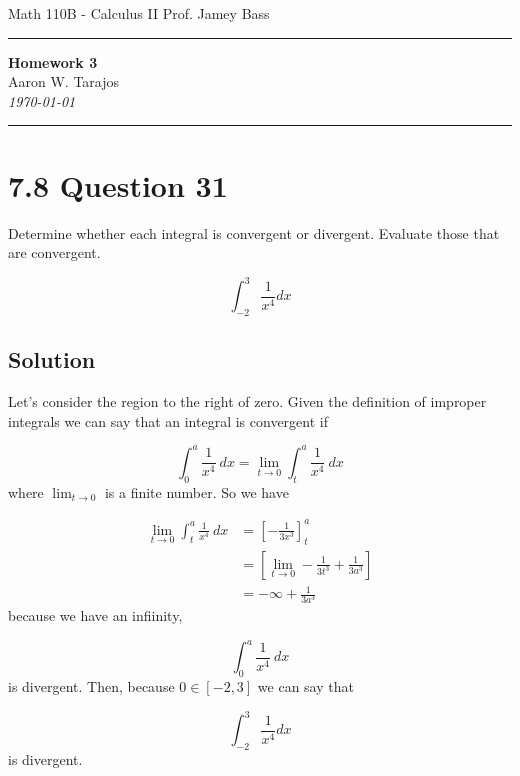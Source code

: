 \documentclass{article}
\begin{document}
\noindent
Math 110B - Calculus II  \hfill Prof. Jamey Bass

\noindent\rule{\textwidth}{0.4pt}

\begin{center}
    \textbf{\LARGE Homework 3} \\
    \vspace{12pt}
    \large Aaron W. Tarajos \\
    \textit{\today}
\end{center}

\noindent\rule{\textwidth}{0.4pt}

\section*{7.8 Question 31}
Determine whether each integral is convergent or divergent. Evaluate those that are convergent.

\[
	\int_{-2}^3 \frac{1}{x^4} dx
\]

\subsection*{Solution}
Let's consider the region to the right of zero. Given the definition of improper integrals we can say that an integral is convergent if

\[
	\int_0^a \frac{1}{x^4}\ dx= \lim_{t \to 0} \int_t^a \frac{1}{x^4}\ dx
\]
where $\lim_{t \to 0}$ is a finite number. So we have

\begin{align*}
	\lim_{t \to 0} \int_t^a \frac{1}{x^4}\ dx &= \left[ -\frac{1}{3x^3} \right]_t^a \\
	&= \left[ \lim_{t \to 0} -\frac{1}{3t^3} + \frac{1}{3a^3}\right] \\
	&= -\infty + \frac{1}{3a^3}
\end{align*}
because we have an infiinity,

\[
	\int_0^a \frac{1}{x^4}\ dx
\]
 is divergent. Then, because $0 \in [-2,3]$ we can say that

\[
	\int_{-2}^3 \frac{1}{x^4} dx
\]
is divergent.
\end{document}
